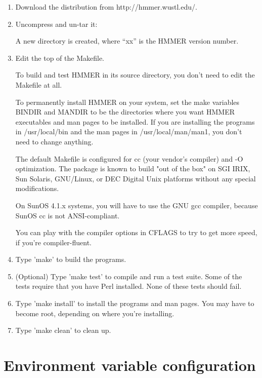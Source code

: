 \begin{enumerate}
\item Download the distribution from http://hmmer.wustl.edu/.

\item Uncompress and un-tar it:\\

	A new directory  is created, where ``xx'' is
	the HMMER version number.

\item Edit the top of the Makefile. 

To build and test HMMER in its source directory, you don't need to
edit the Makefile at all. 

To permanently install HMMER on your system, set the make variables
BINDIR and MANDIR to be the directories where you want HMMER
executables and man pages to be installed. If you are installing the
programs in /usr/local/bin and the man pages in /usr/local/man/man1,
you don't need to change anything.

The default Makefile is configured for cc (your vendor's compiler) and
-O optimization. The package is known to build "out of the box" on SGI
IRIX, Sun Solaris, GNU/Linux, or DEC Digital Unix platforms without
any special modifications. 

On SunOS 4.1.x systems, you will have to use the GNU gcc compiler,
because SunOS cc is not ANSI-compliant.

You can play with the compiler options in CFLAGS to try to get more
speed, if you're compiler-fluent. 

\item Type 'make' to build the programs.

\item (Optional) Type 'make test' to compile and run a test suite.
Some of the tests require that you have Perl installed. None of these
tests should fail.

\item Type 'make install' to install the programs and man pages. 
You may have to become root, depending on where you're installing.

\item Type 'make clean' to clean up. 
\end{enumerate}


\section{Environment variable configuration}

